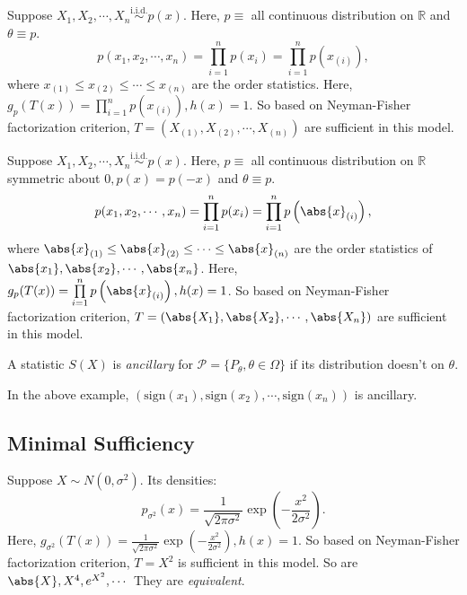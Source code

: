 \documentclass[a4paper]{article}
\begin{document}
\begin{eg}
	Suppose $X_1, X_2, \cdots , X_n \stackrel{\text{i.i.d.}}{\sim} p(x)$. Here, $p \equiv $ all continuous distribution on $\mathbb{R}$ and $\theta \equiv p$.
	\begin{equation*}
		p(x_1,x_2,\cdots,x_n) = \prod\limits_{i=1}^n p(x_i) = \prod\limits_{i=1}^n p\left(x_{(i)}\right),
	\end{equation*}
	where $x_{(1)} \leq x_{(2)} \leq \cdots \leq x_{(n)}$ are the order statistics. Here, $g_p(T(x)) = \prod\limits_{i=1}^n p(x_{(i)}), h(x) = 1$. So based on Neyman-Fisher factorization criterion, $T = \left(X_{(1)}, X_{(2)}, \cdots,X_{(n)}\right)$ are sufficient in this model.
\end{eg}

\begin{eg}
	Suppose $X_1, X_2, \cdots , X_n \stackrel{\text{i.i.d.}}{\sim} p(x)$. Here, $p \equiv $ all continuous distribution on $\mathbb{R}$ symmetric about $0, p(x) = p(-x)$ and $\theta \equiv p$.
	\begin{equation*}
		p(x_1,x_2,\cdots,x_n) = \prod\limits_{i=1}^n p(x_i) = \prod\limits_{i=1}^n p\left(\abs{x}_{(i)}\right),
	\end{equation*}
	where $\abs{x}_{(1)} \leq \abs{x}_{(2)} \leq \cdots \leq \abs{x}_{(n)}$ are the order statistics of $\abs{x_1},\abs{x_2},\cdots,\abs{x_n}$. Here, $g_p(T(x)) = \prod\limits_{i=1}^n p\left(\abs{x}_{(i)}\right), h(x) = 1$. So based on Neyman-Fisher factorization criterion, $T = \left(\abs{X_1},\abs{X_2},\cdots,\abs{X_n}\right)$ are sufficient in this model.
\end{eg}

\begin{defi}[Ancillary]
	A statistic $S(X)$ is \emph{ancillary} for $\mathcal{P}=\{P_\theta, \theta \in \Omega\}$ if its distribution doesn't on $\theta$.
\end{defi}
\noindent In the above example, $(\text{sign}(x_1),\text{sign}(x_2),\cdots,\text{sign}(x_n))$ is ancillary.

\subsection{Minimal Sufficiency}

\begin{eg}
	Suppose $X \sim N(0,\sigma^2)$. Its densities:
	\begin{equation*}
		p_{\sigma^2}(x)=\frac{1}{\sqrt{2 \pi \sigma^2}}\exp\left(-\frac{x^2}{2\sigma^2}\right).
	\end{equation*}
	Here, $g_{\sigma^2}(T(x))=\frac{1}{\sqrt{2 \pi \sigma^2}}\exp\left(-\frac{x^2}{2\sigma^2}\right),h(x)=1$. So based on Neyman-Fisher factorization criterion, $T = X^2$ is sufficient in this model. So are $\abs{X},X^4,e^{X^2},\cdots$ They are \emph{equivalent}.
\end{eg}
\end{document}
